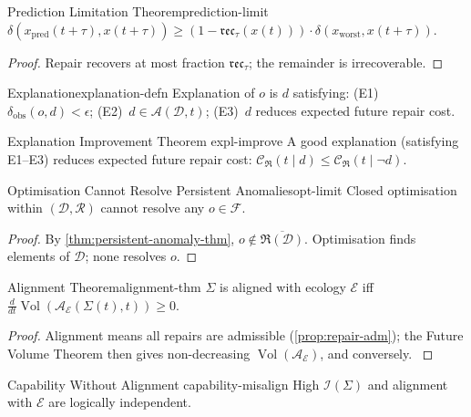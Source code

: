 \documentclass[12pt,twoside,openright]{book}
\newcommand{\adm}{\mathcal{A}}
\newcommand{\repair}{\mathfrak{R}}
\newcommand{\reco}{\mathfrak{rec}}
\newcommand{\Vol}{\operatorname{Vol}}
\begin{document}
\begin{theorem}{Prediction Limitation Theorem}{prediction-limit}
  $\delta(x_\mathrm{pred}(t+\tau),x(t+\tau))
  \ge(1-\reco_\tau(x(t)))\cdot
  \delta(x_\mathrm{worst},x(t+\tau))$.
\end{theorem}
\begin{proof}
  Repair recovers at most fraction $\reco_\tau$;
  the remainder is irrecoverable.
\end{proof}

\begin{definition}{Explanation}{explanation-defn}
  Explanation of $o$ is $d$ satisfying:
  (E1)~$\delta_\mathrm{obs}(o,d)<\epsilon$;
  (E2)~$d\in\adm(\mathcal{D},t)$;
  (E3)~$d$ reduces expected future repair cost.
\end{definition}

\begin{theorem}{Explanation Improvement Theorem}%
  {expl-improve}
  A good explanation (satisfying E1--E3) reduces expected
  future repair cost:
  $\mathcal{C}_\repair(t\mid d)\le
  \mathcal{C}_\repair(t\mid\neg d)$.
\end{theorem}

\begin{proposition}{Optimisation Cannot Resolve Persistent
  Anomalies}{opt-limit}
  Closed optimisation within $(\mathcal{D},\mathcal{R})$
  cannot resolve any $o\in\mathcal{F}$.
\end{proposition}
\begin{proof}
  By \cref{thm:persistent-anomaly-thm},
  $o\notin\overline{\repair(\mathcal{D})}$.
  Optimisation finds elements of $\mathcal{D}$; none
  resolves $o$.
\end{proof}

\begin{theorem}{Alignment Theorem}{alignment-thm}
  $\Sigma$ is aligned with ecology $\mathcal{E}$ iff
  $\frac{d}{dt}\Vol(\adm_\mathcal{E}(\Sigma(t),t))\ge0$.
\end{theorem}
\begin{proof}
  Alignment means all repairs are admissible
  (\cref{prop:repair-adm}); the Future Volume Theorem
  then gives non-decreasing $\Vol(\adm_\mathcal{E})$,
  and conversely.
  \parencite{amodei2016,russell2019}
\end{proof}

\begin{corollary}{Capability Without Alignment}%
  {capability-misalign}
  High $\mathcal{I}(\Sigma)$ and alignment with
  $\mathcal{E}$ are logically independent.
\end{corollary}
\end{document}
